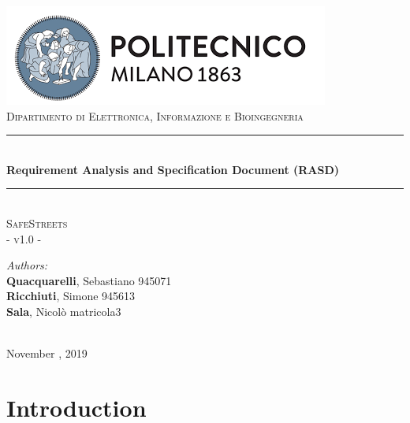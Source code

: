 \documentclass{article}
\begin{document}
	\begin{titlepage}
		
		\centering
		\vspace*{0.7 cm}
		\includegraphics[scale = 0.7]{images/PolimiLogo.png}\\[1 cm]
		\textsc{\large Dipartimento di Elettronica, Informazione e Bioingegneria}\\[2 cm]
		
		\rule{\linewidth}{0.2 mm} \\[0.5 cm]
		{\huge \bfseries Requirement Analysis and Specification Document (RASD)}\\
		\rule{\linewidth}{0.2 mm} \\[1.5 cm]
		
		\textsc{\Large SafeStreets}\\[0.5 cm]
		\textsc{\large - v1.0 -}\\[1 cm]
		
		\begin{minipage}{\textwidth}
			\begin{flushleft} \large
				\emph{Authors:}\\
				\textbf{Quacquarelli}, Sebastiano \hfill 945071 \\
				\textbf{Ricchiuti}, Simone \hfill 945613  \\
				\textbf{Sala}, Nicolò \hfill matricola3 \\[2 cm]
			\end{flushleft}
		\end{minipage}\\[2 cm]
		
		{\large November  , 2019}\\[2 cm]
		
	\end{titlepage}
	
	\tableofcontents
	
	\newpage
	\setcounter{page}{1}
	
	\section{Introduction}
\end{document}
